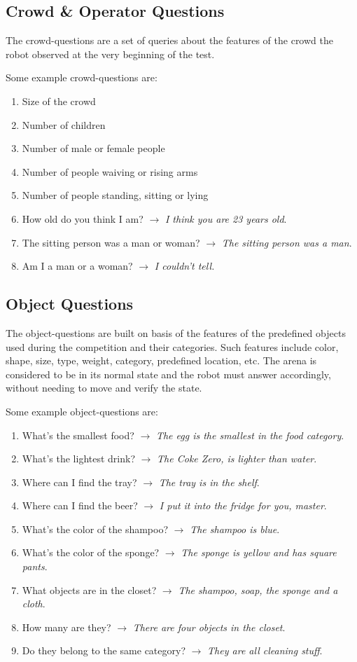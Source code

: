 \subsection{Crowd \& Operator Questions}
The crowd-questions are a set of queries about the features of the crowd the robot observed at the very beginning of the test.

Some example crowd-questions are:
\begin{enumerate}
    \item Size of the crowd
    \item Number of children
    \item Number of male or female people
    \item Number of people waiving or rising arms
    \item Number of people standing, sitting or lying
    \item How old do you think I am? $\rightarrow$ \textit{I think you are 23 years old}.
    \item The sitting person was a man or woman? $\rightarrow$ \textit{The sitting person was a man}.
    \item Am I a man or a woman? $\rightarrow$ \textit{I couldn't tell.}
\end{enumerate}

\subsection{Object Questions}
The object-questions are built on basis of the features of the predefined objects used during the competition and their categories. Such features include color, shape, size, type, weight, category, predefined location, etc. The arena is considered to be in its normal state and the robot must answer accordingly, without needing to move and verify the state.

Some example object-questions are:
\begin{enumerate}
    \item What's the smallest food? $\rightarrow$ \textit{The egg is the smallest in the food category}.
    \item What's the lightest drink? $\rightarrow$ \textit{The Coke Zero, is lighter than water}.
    \item Where can I find the tray? $\rightarrow$ \textit{The tray is in the shelf}.
    \item Where can I find the beer? $\rightarrow$ \textit{I put it into the fridge for you, master}.
    \item What's the color of the shampoo? $\rightarrow$ \textit{The shampoo is blue}.
    \item What's the color of the sponge? $\rightarrow$ \textit{The sponge is yellow and has square pants}.
    \item What objects are in the closet? $\rightarrow$ \textit{The shampoo, soap, the sponge and a cloth}.
    \item How many are they? $\rightarrow$ \textit{There are four objects in the closet}.
    \item Do they belong to the same category? $\rightarrow$ \textit{They are all cleaning stuff}.
\end{enumerate}


